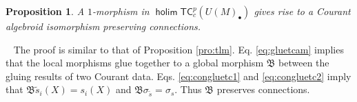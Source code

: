 \documentclass[letterpaper,10pt, oneside]{article} %
\newtheorem{pro}[thm]{Proposition}
\newcommand{\calc}[1]{} %
\newcommand{\tcalgdp}{{\mathsf{TC}^{p}_{c}}} %
\DeclareMathOperator{\holim}{\mathsf{holim}}
\newcommand{\pf}{\noindent{\bf Proof.}\ }
\newcommand{\ii}{\mathbbm i}
\newcommand{\frkB}{\mathfrak B}
\def\qed{\hfill ~\vrule height6pt width6pt depth0pt}
\begin{document}
\begin{pro}\label{pro:tcm}
A $1$-morphism  in $\holim \tcalgdp(U(M)_\bullet)$ gives rise to a Courant algebroid isomorphism preserving connections.
  \end{pro}
\pf
The proof is similar to that of Proposition \ref{pro:tlm}. Eq. \eqref{eq:gluetcam} implies that the local morphisms glue together to a global morphism $\frkB$ between the gluing results of two Courant data. Eqs. \eqref{eq:congluetc1} and \eqref{eq:congluetc2} imply that $ \frkB \widetilde{s}_i(X) = s_i(X)$ and $\frkB\sigma_{\widetilde{s}}=\sigma_s$. Thus $\frkB$ preserves connections.
\calc{By \eqref{eq:gluetcam},   $\{ \left(\begin{array}{ccc}
1&0&0\\
\phi_i&\tau&0\\
\beta_i&-2\phi_i^\star\tau_i&1
\end{array}\right)\}$ glue to a bundle map $\frkB:C\longrightarrow C$. Obviously, $\frkB$ preserves the pairings and anchor maps. Furthermore, also by \eqref{eq:gluetcam}, $\frkB$ also preserves the brackets. Thus, $\frkB$ is a homomorphism between Courant algebroids.

 By \eqref{eq:congluetc1} and \eqref{eq:congluetc2},  we have
\begin{eqnarray*}
  \frkB \widetilde{s}_i(X)&=&\left(\begin{array}{ccc}
1&0&0\\
\phi_{i}&\tau_{i}&0\\
\beta_{i}&-2\phi_{i}^\star\tau_{i}&1
\end{array}\right)\left(\begin{array}{c}
X\\
\widetilde{\theta}_i(X)\\
-(\widetilde{\theta}_i,\theta_i(X))^\g-\ii_X\widetilde{B}_i
\end{array}\right)\\
&=&\left(\begin{array}{c}
X\\
\phi_{i}(X)+\tau_{i}\widetilde{\theta}_i(X)\\
\beta_{i}(X)-2\phi_{i}^\star\tau_{i}\widetilde{\theta}_i(X))^\g-(\widetilde{\theta}_i,\widetilde{\theta}_i(X))^\g-\ii_X\widetilde{B}_i
\end{array}\right)\\
&=&\left(\begin{array}{c}
X\\
\theta_i(X)\\
-(\theta_i,\theta_i(X))^\g-\ii_XB_i
\end{array}\right)\\
&=&s_i(X).
\end{eqnarray*}
Similarly, one can show that   $\frkB\sigma_{\widetilde{s}}=\sigma_s$.
}\qed\\
\end{document}
